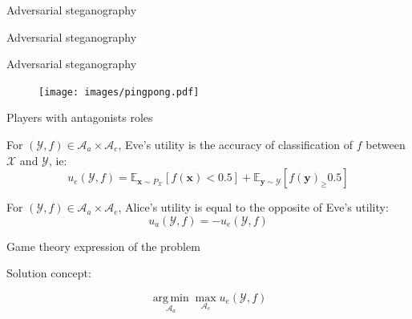 \documentclass[10pt]{beamer}
\DeclareMathOperator*{\argmin}{arg\,min} %
\begin{document}
\begin{frame}{Adversarial steganography}
\end{frame}


\begin{frame}{Adversarial steganography}
\end{frame}



\begin{frame}{Adversarial steganography}
  \begin{figure}
        \texttt{[image: images/pingpong.pdf]}
    \end{figure}
\end{frame}



\begin{frame}{Players with antagonists roles}


\begin{tcolorbox}[colback=lightgreen,colframe=greentheme,title=\textbf{Definition} (Eve's utility)]
For $(\mathcal{Y}, f)  \in \mathcal{A}_a \times \mathcal{A}_e$, Eve's utility is the accuracy of classification of $f$ between $\mathcal{X}$ and $\mathcal{Y}$, ie:
\begin{equation}
    u_e(\mathcal{Y}, f) = \mathbb{E}_{\mathbf{x}\sim P_{\mathcal{X}}}[f(\mathbf{x}) < 0.5] + \mathbb{E}_{\mathbf{y} \sim \mathcal{Y}}[f(\mathbf{y})_ \geq 0.5]
\end{equation}
\end{tcolorbox}


\pause


\begin{tcolorbox}[colback=lightgreen,colframe=greentheme,title=\textbf{Definition} (Alice's utility)]
For $(\mathcal{Y}, f)  \in \mathcal{A}_a \times \mathcal{A}_e$, Alice's utility is equal to the opposite of Eve's utility:
\begin{equation}
    u_a(\mathcal{Y}, f) = - u_e(\mathcal{Y}, f)
\end{equation}
\end{tcolorbox}

\end{frame}

\begin{frame}{Game theory expression of the problem}

Solution concept:

\alert{
\begin{equation}
\underset{\mathcal{A}_a}{\argmin} \max_{\mathcal{A}_e} u_e(\mathcal{Y}, f)
\label{eq:minmax}
\end{equation}}

\pause


    
\end{frame}
\end{document}
